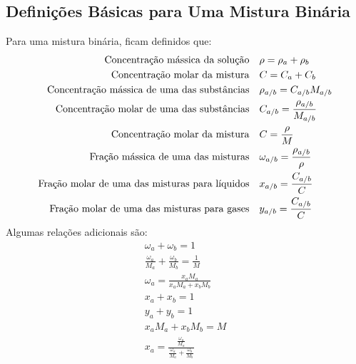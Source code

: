 \subsection{Definições Básicas para Uma Mistura Binária}
Para uma mistura binária, ficam definidos que:
\begin{align}
    \text{Concentração mássica da solução} \quad & \rho = \rho _{a} + \rho _{b} \label{eq:conc_massica_solucao} \\
    \text{Concentração molar da mistura} \quad & C = C_{a} + C_{b} \label{eq:conc_molar_mistura} \\
    \text{Concentração mássica de uma das substâncias} \quad & \rho_{a / b} = C_{a / b} M_{a / b} \label{eq:conc_massica_substancia} \\
    \text{Concentração molar de uma das substâncias} \quad & C_{a / b} = \frac{\rho_{a / b}}{M_{a / b}} \label{eq:conc_molar_substancia} \\
    \text{Concentração molar da mistura} \quad & C = \frac{\rho }{M} \label{eq:conc_molar_mistura_{total}}\\
    \text{Fração mássica de uma das misturas} \quad & \omega _{a / b} = \frac{\rho _{a / b} }{\rho } \label{eq:frac_massica_substancia} \\
    \text{Fração molar de uma das misturas para líquidos} \quad & x_{a / b} = \frac{C_{a / b} }{C} \label{eq:frac_molar_substancia_liq} \\
    \text{Fração molar de uma das misturas para gases} \quad & y_{a / b} = \frac{C_{a / b} }{C} \label{eq:frac_molar_substancia_gas}
\end{align}
Algumas relações adicionais são:
\begin{align}
    \omega _{a} + \omega _{b} = 1 \label{eq: relacao_frac_massica} \\
    \frac{\omega _{a} }{M_{a} } + \frac{\omega _{b} }{M_{b} } = \frac{1}{M} \label{eq:relacao_frac_massica_massa_molar} \\
    \omega _{a} = \frac{x_{a} M_{a} }{x_{a} M_{a} + x_{b} M_{b} } \label{eq:relacao_frac_massica_frac_molar} \\
    x_{a} + x_{b} = 1 \label{eq:relacao_frac_molar_liq} \\
    y_{a} + y_{b} = 1 \label{eq:relacao_frac_molar_gas} \\
    x_{a} M_{a} + x_{b} M_{b} = M \label{eq:relacao_frac_molar_massa_molar} \\
    x_{a} = \frac{\frac{\omega _{a} }{M_{a} } }{\frac{\omega _{a} }{M_{a} } + \frac{\omega _{b} }{M_{b} } } \label{eq:relacao_frac_molar_frac_massica} \\
\end{align}
